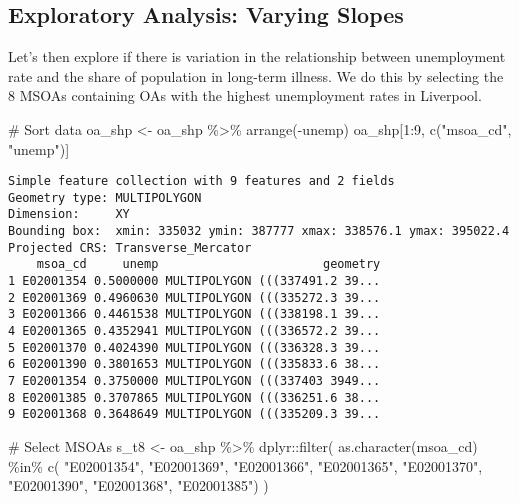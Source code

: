 \documentclass[
  letterpaper,
  krantz2]{style/krantz}
\newenvironment{Shaded}{\begin{snugshade}}{\end{snugshade}}
\newcommand{\CommentTok}[1]{\textcolor[rgb]{0.37,0.37,0.37}{#1}}
\newcommand{\DecValTok}[1]{\textcolor[rgb]{0.68,0.00,0.00}{#1}}
\newcommand{\FunctionTok}[1]{\textcolor[rgb]{0.28,0.35,0.67}{#1}}
\newcommand{\NormalTok}[1]{\textcolor[rgb]{0.00,0.23,0.31}{#1}}
\newcommand{\OtherTok}[1]{\textcolor[rgb]{0.00,0.23,0.31}{#1}}
\newcommand{\SpecialCharTok}[1]{\textcolor[rgb]{0.37,0.37,0.37}{#1}}
\newcommand{\StringTok}[1]{\textcolor[rgb]{0.13,0.47,0.30}{#1}}
\begin{document}
\hypertarget{exploratory-analysis-varying-slopes}{%
\subsection{Exploratory Analysis: Varying
Slopes}\label{exploratory-analysis-varying-slopes}}

Let's then explore if there is variation in the relationship between
unemployment rate and the share of population in long-term illness. We
do this by selecting the 8 MSOAs containing OAs with the highest
unemployment rates in Liverpool.

\begin{Shaded}
\begin{Highlighting}[]
\CommentTok{\# Sort data }
\NormalTok{oa\_shp }\OtherTok{\textless{}{-}}\NormalTok{ oa\_shp }\SpecialCharTok{\%\textgreater{}\%} \FunctionTok{arrange}\NormalTok{(}\SpecialCharTok{{-}}\NormalTok{unemp)}
\NormalTok{oa\_shp[}\DecValTok{1}\SpecialCharTok{:}\DecValTok{9}\NormalTok{, }\FunctionTok{c}\NormalTok{(}\StringTok{"msoa\_cd"}\NormalTok{, }\StringTok{"unemp"}\NormalTok{)]}
\end{Highlighting}
\end{Shaded}

\begin{verbatim}
Simple feature collection with 9 features and 2 fields
Geometry type: MULTIPOLYGON
Dimension:     XY
Bounding box:  xmin: 335032 ymin: 387777 xmax: 338576.1 ymax: 395022.4
Projected CRS: Transverse_Mercator
    msoa_cd     unemp                       geometry
1 E02001354 0.5000000 MULTIPOLYGON (((337491.2 39...
2 E02001369 0.4960630 MULTIPOLYGON (((335272.3 39...
3 E02001366 0.4461538 MULTIPOLYGON (((338198.1 39...
4 E02001365 0.4352941 MULTIPOLYGON (((336572.2 39...
5 E02001370 0.4024390 MULTIPOLYGON (((336328.3 39...
6 E02001390 0.3801653 MULTIPOLYGON (((335833.6 38...
7 E02001354 0.3750000 MULTIPOLYGON (((337403 3949...
8 E02001385 0.3707865 MULTIPOLYGON (((336251.6 38...
9 E02001368 0.3648649 MULTIPOLYGON (((335209.3 39...
\end{verbatim}

\begin{Shaded}
\begin{Highlighting}[]
\CommentTok{\# Select MSOAs}
\NormalTok{s\_t8 }\OtherTok{\textless{}{-}}\NormalTok{ oa\_shp }\SpecialCharTok{\%\textgreater{}\%}\NormalTok{ dplyr}\SpecialCharTok{::}\FunctionTok{filter}\NormalTok{(}
    \FunctionTok{as.character}\NormalTok{(msoa\_cd) }\SpecialCharTok{\%in\%} \FunctionTok{c}\NormalTok{(}
      \StringTok{"E02001354"}\NormalTok{, }
      \StringTok{"E02001369"}\NormalTok{, }
      \StringTok{"E02001366"}\NormalTok{, }
      \StringTok{"E02001365"}\NormalTok{, }
      \StringTok{"E02001370"}\NormalTok{, }
      \StringTok{"E02001390"}\NormalTok{, }
      \StringTok{"E02001368"}\NormalTok{, }
      \StringTok{"E02001385"}\NormalTok{)}
\NormalTok{    )}
\end{Highlighting}
\end{Shaded}
\end{document}

